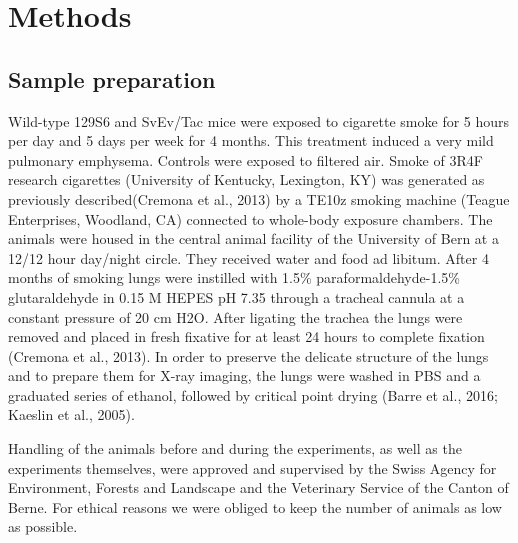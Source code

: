 \section{Methods}\label{sec:methods}
\subsection{Sample preparation}
Wild-type 129S6 and SvEv/Tac mice \cite{Dai_2015} were exposed to cigarette smoke for 5 hours per day and 5 days per week for 4 months. This treatment induced a very mild pulmonary emphysema. Controls were exposed to filtered air. Smoke of 3R4F research cigarettes (University of Kentucky, Lexington, KY) was generated as previously described(Cremona et al., 2013) by a TE10z smoking machine (Teague Enterprises, Woodland, CA) connected to whole-body exposure chambers. The animals were housed in the central animal facility of the University of Bern at a 12/12 hour day/night circle. They received water and food ad libitum. After 4 months of smoking lungs were instilled with 1.5\% paraformaldehyde-1.5\% glutaraldehyde in 0.15 M HEPES pH 7.35 through a tracheal cannula at a constant pressure of 20 cm H2O. After ligating the trachea the lungs were removed and placed in fresh fixative for at least 24 hours to complete fixation (Cremona et al., 2013). In order to preserve the delicate structure of the lungs and to prepare them for X-ray imaging, the lungs were washed in PBS and a graduated series of ethanol, followed by critical point drying (Barre et al., 2016; Kaeslin et al., 2005).

Handling of the animals before and during the experiments, as well as the experiments themselves, were approved and supervised by the Swiss Agency for Environment, Forests and Landscape and the Veterinary Service of the Canton of Berne. For ethical reasons we were obliged to keep the number of animals as low as possible.

